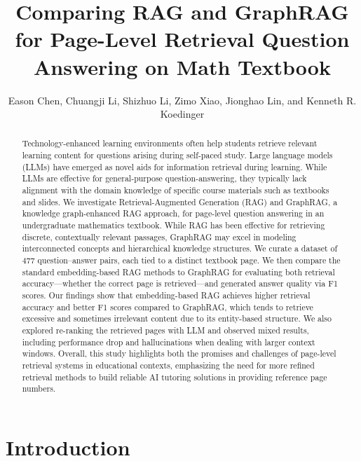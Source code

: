 \documentclass[runningheads]{llncs}
\begin{document}
%
\title{Comparing RAG and GraphRAG for Page-Level Retrieval Question Answering on Math Textbook}
%
\author{Eason Chen, Chuangji Li, Shizhuo Li, Zimo Xiao, Jionghao Lin, and Kenneth R. Koedinger}
%
%
%
\maketitle 

\begin{abstract}
Technology-enhanced learning environments often help students retrieve relevant learning content for questions arising during self-paced study.
Large language models (LLMs) have emerged as novel aids for information retrieval during learning. While LLMs are effective for general-purpose question-answering, they typically lack alignment with the domain knowledge of specific course materials such as textbooks and slides. We investigate Retrieval-Augmented Generation (RAG) and GraphRAG, a knowledge graph-enhanced RAG approach, for page-level question answering in an undergraduate mathematics textbook. While RAG has been effective for retrieving discrete, contextually relevant passages, GraphRAG may excel in modeling interconnected concepts and hierarchical knowledge structures. We curate a dataset of 477 question–answer pairs, each tied to a distinct textbook page. We then compare the standard embedding-based RAG methods to GraphRAG for evaluating both retrieval accuracy—whether the correct page is retrieved—and generated answer quality via F1 scores.
Our findings show that embedding-based RAG achieves higher retrieval accuracy and better F1 scores compared to GraphRAG, which tends to retrieve excessive and sometimes irrelevant content due to its entity-based structure. We also explored re-ranking the retrieved pages with LLM and observed mixed results, including performance drop and hallucinations when dealing with larger context windows. Overall, this study highlights both the promises and challenges of page-level retrieval systems in educational contexts, emphasizing the need for more refined retrieval methods to build reliable AI tutoring solutions in providing reference page numbers.
\end{abstract}


\section{Introduction}\label{sec1}
\end{document}
